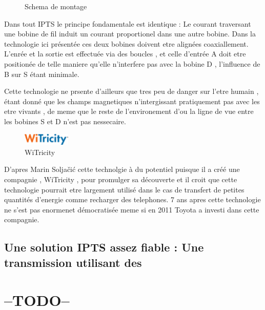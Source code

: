\documentclass[11pt]{report}
\begin{document}
\begin{figure}
  \begin{center}
    \setlength\fboxsep{0pt}
    \setlength\fboxrule{0.5pt}
  \end{center}
  \caption{Schema de montage}
\end{figure} Dans tout IPTS le principe fondamentale est identique : Le courant traversant une bobine de fil induit un courant proportionel dans une autre bobine. Dans la technologie ici présentée ces deux bobines doivent etre alignées coaxiallement. L'enrée et la sortie est effectuée via des boucles , et celle d'entrée A doit etre positionée de telle maniere qu'elle n'interfere pas avec la bobine D , l'influence de B sur S étant minimale.

  Cette technologie ne prsente d'ailleurs que tres peu de danger sur l'etre humain , étant donné que les champs magnetiques n'intergissant pratiquement pas avec les etre vivants , de meme que le reste de l'environement d'ou la ligne de vue entre les bobines S et D n'est pas nessecaire.
\begin{figure}
  \begin{center}
  \includegraphics[width=0.2\textwidth]{witricity}
  \end{center}
  \caption{WiTricity}
\end{figure} D'apres Marin Soljačić cette technolgie à du potentiel puisque il a créé une compagnie , WiTricity , pour promulger sa découverte et il croit que cette technologie pourrait etre largement utilisé dans le cas de transfert de petites quantités d'energie comme recharger des telephones. 7 ans apres cette technologie ne s'est pas enormenet démocratisée meme si en 2011 Toyota a investi dans cette compagnie.
\subsection{Une solution IPTS assez fiable : Une transmission utilisant des }
\section{--TODO--} %
\end{document}
